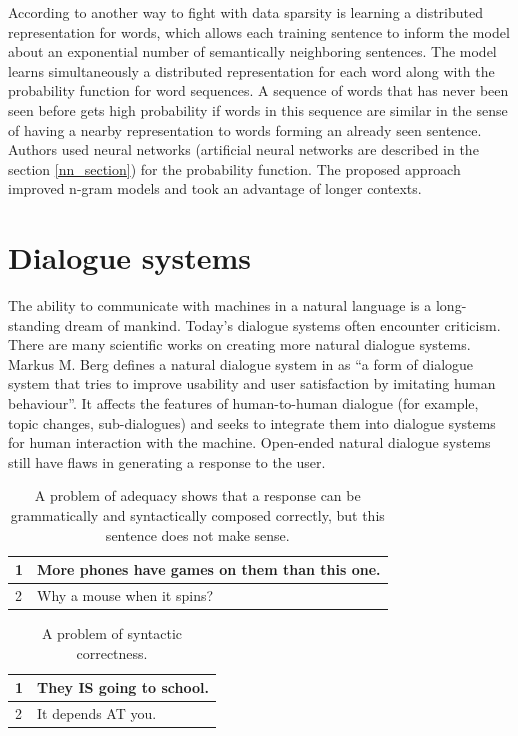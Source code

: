 According to \cite{bengio2003neural} another way to fight with data sparsity is learning a distributed representation for words, which allows each training sentence to inform the model about an exponential number of semantically neighboring sentences. The model learns simultaneously a distributed representation for each word along with the probability function for word sequences. A sequence of words that has never been seen before gets high probability if words in this sequence are similar in the sense of having a nearby representation to words forming an already seen sentence. Authors used neural networks (artificial neural networks are described in the section \ref{nn_section}) for the probability function. The proposed approach improved n-gram models and took an advantage of longer contexts.


\section{Dialogue systems}\label{nlg_ds_problems}
The ability to communicate with machines in a natural language is a long-standing dream of mankind. Today's dialogue systems often encounter criticism. There are many scientific works on creating more natural dialogue systems. Markus M. Berg defines a natural dialogue system in \cite{berg2014modelling} as ``a form of dialogue system that tries to improve usability and user satisfaction by imitating human behaviour''. It affects the features of human-to-human dialogue (for example, topic changes, sub-dialogues) and seeks to integrate them into dialogue systems for human interaction with the machine. Open-ended natural dialogue systems still have flaws in generating a response to the user.

\begin{table}[ht]
\centering
 \begin{tabular}{|p{0.5cm}|p{8cm}|} 
 \hline
 1 & More phones have games on them than this one. \\
 \hline
 2 & Why a mouse when it spins? \\
 \hline
 \end{tabular}
 \caption{A problem of adequacy shows that a response can be grammatically and syntactically composed correctly, but this sentence does not make sense.}
\label{tab:adequacy_prob}
\end{table}

\begin{table}[ht]
\centering
 \begin{tabular}{|p{0.5cm}|p{8cm}|} 
 \hline
 1 & They IS going to school. \\ 
 \hline
 2 & It depends AT you. \\
 \hline
 \end{tabular}
 \caption{A problem of syntactic correctness.}
\label{tab:syntactic_corr_prob}
\end{table}


